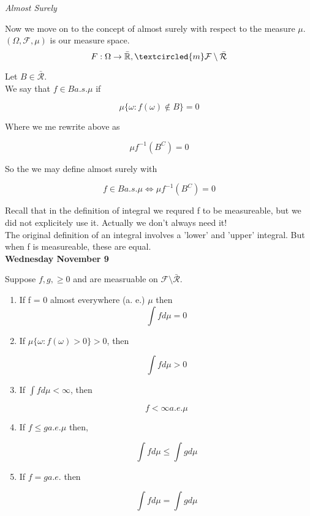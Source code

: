 \documentclass[11pt,fleqn]{book} %
\begin{document}
\textit{Almost Surely}

Now we move on to the concept of almost surely with respect to the measure $\mu$.\\

$(\Omega, \mathcal{F}, \mu)$ is our measure space.\\

		$$F: \Omega\rightarrow \bar{\mathbb{R}}, \textcircled{m} \mathcal{F}\setminus\bar{\mathcal{R}} $$

\begin{definition}
Let $B \in \bar{\mathcal{R}}$. \\

We say that $f \in B a.s. \mu$ if

		$$ \mu\{\omega:f(\omega)\notin B \} = 0$$

Where we me rewrite above as 

		$$\mu f^{-1} (B^C) = 0 $$ 


So the we may define almost surely with 

		$$f \in B a.s. \mu \Leftrightarrow \mu f^{-1} (B^C) = 0 $$ 

\end{definition}


Recall that in the definition of integral we requred f to be measureable, but we did not explicitely use it. Actually we don't always need it!\\

The original definition of an integral involves a 'lower' and 'upper' integral. But when f is measureable, these are equal. \\

\textbf{Wednesday November 9}\\

\begin{theorem}
Suppose $f, g, \geq 0$ and are measruable on $\mathcal{F} \setminus \mathcal{\bar{R}}$.

	\begin{enumerate}
	           \item If f = 0 almost everywhere (a. e.) $\mu$ then 
	           		$$\int f d\mu = 0 $$

	           \item If $\mu\{\omega: f(\omega) > 0 \} >0$, then

	           			$$\int f d\mu  > 0 $$

	           \item If $\int f d\mu < \infty$, then

	           			$$f < \infty a.e. \mu $$


	           \item If $f \leq g a.e. \mu$ then, 

	           		$$\int f d\mu \leq \int g d\mu $$

	           \item If $f = g a.e.$ then

	           		$$\int f d\mu = \int g d\mu $$   		
	\end{enumerate}                 	
\end{theorem}
\end{document}
